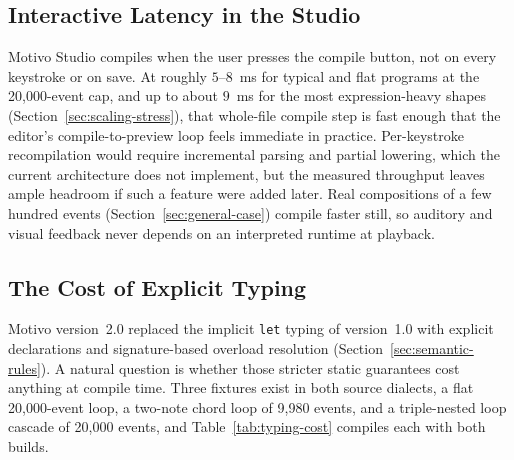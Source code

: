 \subsection{Interactive Latency in the Studio}\label{detail-subsec:execution-speed-and-real-time-viability}

Motivo Studio compiles when the user presses the compile button, not on every keystroke or on save.
At roughly $5$--$8$~ms for typical and flat programs at the 20{,}000-event cap, and up to about $9$~ms for the most
expression-heavy shapes (Section~\ref{sec:scaling-stress}), that whole-file compile step is fast enough that the
editor's compile-to-preview loop feels immediate in practice.
Per-keystroke recompilation would require incremental parsing and partial lowering, which the current architecture does
not implement, but the measured throughput leaves ample headroom if such a feature were added later.
Real compositions of a few hundred events (Section~\ref{sec:general-case}) compile faster still, so auditory and visual
feedback never depends on an interpreted runtime at playback.

\subsection{The Cost of Explicit Typing}\label{detail-subsec:typing-cost}

Motivo version~2.0 replaced the implicit \texttt{let} typing of version~1.0 with explicit declarations and
signature-based overload resolution (Section~\ref{sec:semantic-rules}).
A natural question is whether those stricter static guarantees cost anything at compile time.
Three fixtures exist in both source dialects, a flat 20{,}000-event loop, a two-note chord loop of 9{,}980 events, and a
triple-nested loop cascade of 20{,}000 events, and Table~\ref{tab:typing-cost} compiles each with both builds.

